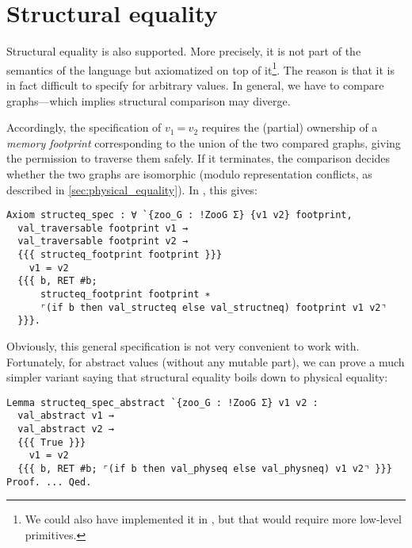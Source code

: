 \section{Structural equality}
\label{sec:structural_equality}

Structural equality is also supported.
More precisely, it is not part of the semantics of the language but axiomatized on top of it\footnote{We could also have implemented it in \ZooLang, but that would require more low-level primitives.}.
The reason is that it is in fact difficult to specify for arbitrary values.
In general, we have to compare graphs---which implies structural comparison may diverge.

Accordingly, the specification of $v_1\ \texttt{=}\ v_2$ requires the (partial) ownership of a \emph{memory footprint} corresponding to the union of the two compared graphs, giving the permission to traverse them safely.
If it terminates, the comparison decides whether the two graphs are isomorphic (modulo representation conflicts, as described in \cref{sec:physical_equality}).
In \Iris, this gives:

\begin{verbatim}
Axiom structeq_spec : ∀ `{zoo_G : !ZooG Σ} {v1 v2} footprint,
  val_traversable footprint v1 →
  val_traversable footprint v2 →
  {{{ structeq_footprint footprint }}}
    v1 = v2
  {{{ b, RET #b;
      structeq_footprint footprint ∗
      ⌜(if b then val_structeq else val_structneq) footprint v1 v2⌝
  }}}.
\end{verbatim}

Obviously, this general specification is not very convenient to work with.
Fortunately, for abstract values (without any mutable part), we can prove a much simpler variant saying that structural equality boils down to physical equality:

\begin{verbatim}
Lemma structeq_spec_abstract `{zoo_G : !ZooG Σ} v1 v2 :
  val_abstract v1 →
  val_abstract v2 →
  {{{ True }}}
    v1 = v2
  {{{ b, RET #b; ⌜(if b then val_physeq else val_physneq) v1 v2⌝ }}}
Proof. ... Qed.
\end{verbatim}
